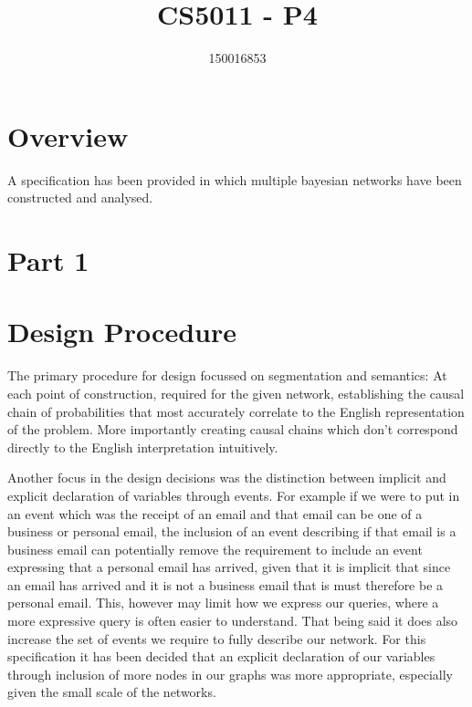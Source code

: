 \documentclass[10pt,a4paper]{article}
\author{150016853}
\title{CS5011 - P4}
\begin{document}
\maketitle

\section{Overview}

A specification has been provided in which multiple bayesian networks have been constructed and analysed. 

\section{Part 1}

\section{Design Procedure}

The primary procedure for design focussed on segmentation and semantics: At each point of construction, required for the given network,  establishing the causal chain of probabilities that most accurately correlate to the English representation of the problem. More importantly creating causal chains which don't correspond directly to the English interpretation intuitively. 

Another focus in the design decisions was the distinction between implicit and explicit declaration of variables through events. For example if we were to put in an event which was the receipt of an email and that email can be one of a business or personal email, the inclusion of an event describing if that email is a business email can potentially remove the requirement to include an event expressing that a personal email has arrived, given that it is implicit that since an email has arrived and it is not a business email that is must therefore be a personal email. This, however may limit how we express our queries, where a more expressive query is often easier to understand. That being said it does also increase the set of events we require to fully describe our network. For this specification it has been decided that an explicit declaration of our variables through inclusion of more nodes in our graphs was more appropriate, especially given the small scale of the networks.
\end{document}
